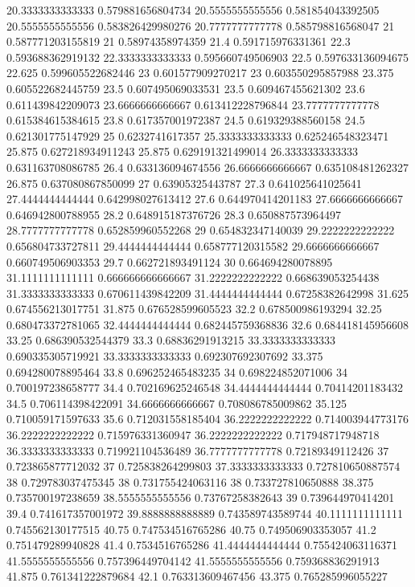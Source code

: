 {20.3333333333333 0.579881656804734
20.5555555555556 0.581854043392505
20.5555555555556 0.583826429980276
20.7777777777778 0.585798816568047
21 0.587771203155819
21 0.58974358974359
21.4 0.591715976331361
22.3 0.593688362919132
22.3333333333333 0.595660749506903
22.5 0.597633136094675
22.625 0.599605522682446
23 0.601577909270217
23 0.603550295857988
23.375 0.605522682445759
23.5 0.607495069033531
23.5 0.609467455621302
23.6 0.611439842209073
23.6666666666667 0.613412228796844
23.7777777777778 0.615384615384615
23.8 0.617357001972387
24.5 0.619329388560158
24.5 0.621301775147929
25 0.6232741617357
25.3333333333333 0.625246548323471
25.875 0.627218934911243
25.875 0.629191321499014
26.3333333333333 0.631163708086785
26.4 0.633136094674556
26.6666666666667 0.635108481262327
26.875 0.637080867850099
27 0.63905325443787
27.3 0.641025641025641
27.4444444444444 0.642998027613412
27.6 0.644970414201183
27.6666666666667 0.646942800788955
28.2 0.648915187376726
28.3 0.650887573964497
28.7777777777778 0.652859960552268
29 0.654832347140039
29.2222222222222 0.656804733727811
29.4444444444444 0.658777120315582
29.6666666666667 0.660749506903353
29.7 0.662721893491124
30 0.664694280078895
31.1111111111111 0.666666666666667
31.2222222222222 0.668639053254438
31.3333333333333 0.670611439842209
31.4444444444444 0.67258382642998
31.625 0.674556213017751
31.875 0.676528599605523
32.2 0.678500986193294
32.25 0.680473372781065
32.4444444444444 0.682445759368836
32.6 0.684418145956608
33.25 0.686390532544379
33.3 0.68836291913215
33.3333333333333 0.690335305719921
33.3333333333333 0.692307692307692
33.375 0.694280078895464
33.8 0.696252465483235
34 0.698224852071006
34 0.700197238658777
34.4 0.702169625246548
34.4444444444444 0.70414201183432
34.5 0.706114398422091
34.6666666666667 0.708086785009862
35.125 0.710059171597633
35.6 0.712031558185404
36.2222222222222 0.714003944773176
36.2222222222222 0.715976331360947
36.2222222222222 0.717948717948718
36.3333333333333 0.719921104536489
36.7777777777778 0.72189349112426
37 0.723865877712032
37 0.725838264299803
37.3333333333333 0.727810650887574
38 0.729783037475345
38 0.731755424063116
38 0.733727810650888
38.375 0.735700197238659
38.5555555555556 0.73767258382643
39 0.739644970414201
39.4 0.741617357001972
39.8888888888889 0.743589743589744
40.1111111111111 0.745562130177515
40.75 0.747534516765286
40.75 0.749506903353057
41.2 0.751479289940828
41.4 0.7534516765286
41.4444444444444 0.755424063116371
41.5555555555556 0.757396449704142
41.5555555555556 0.759368836291913
41.875 0.761341222879684
42.1 0.763313609467456
43.375 0.765285996055227
}
